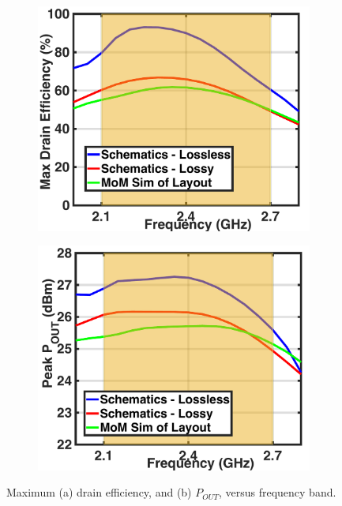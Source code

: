 \documentclass[conference]{IEEEtran}
\begin{document}
\begin{figure}[!t]
\captionsetup{font=footnotesize}
\centering
\begin{subfigure}{0.24\textwidth}
\centering
\includegraphics[width=1\textwidth]{Images/Output_Network_Comp/Comp_DE_loss_layout_km0p69.pdf}
\caption{}
\label{fig:Comp_DE_loss_layout}
\end{subfigure}
\begin{subfigure}{0.24\textwidth}
\includegraphics[width=1\textwidth]{Images/Output_Network_Comp/Comp_Pout_loss_layout_km0p69.pdf}
\caption{}
\label{fig:Comp_Pout_loss_layout}
\end{subfigure}
\caption{Maximum  (a) drain efficiency, and (b) $P_{OUT}$, versus frequency band.}
\label{fig:Comp_Pout_DE}
\vspace{-0.25in}
\end{figure}
\end{document}
